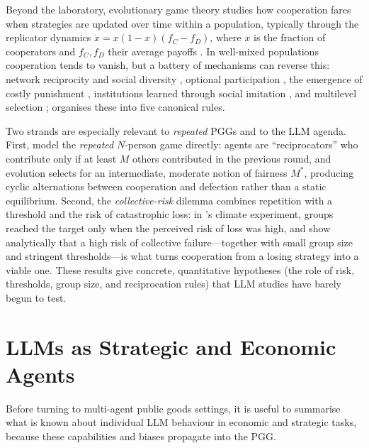 \documentclass[11pt,a4paper]{article}
\begin{document}
Beyond the laboratory, evolutionary game theory studies how cooperation fares
when strategies are updated over time within a population, typically through the
replicator dynamics $\dot{x}=x(1-x)(f_C-f_D)$, where $x$ is the fraction of
cooperators and $f_C,f_D$ their average payoffs
\citep{hofbauer1998evolutionary,sigmund2010calculus}. In well-mixed populations
cooperation tends to vanish, but a battery of mechanisms can reverse this:
network reciprocity and social diversity \citep{santos2008social,szabo2007evolutionary,
perc2017statistical}, optional participation \citep{hauert2002volunteering},
the emergence of costly punishment \citep{hauert2007freedom,boyd2003evolution},
institutions learned through social imitation \citep{sigmund2010social}, and
multilevel selection \citep{traulsen2006evolution}; \citet{nowak2006five}
organises these into five canonical rules.

Two strands are especially relevant to \emph{repeated} PGGs and to the LLM agenda.
First, \citet{vansegbroeck2012emergence} model the \emph{repeated} $N$-person
game directly: agents are ``reciprocators'' who contribute only if at least $M$
others contributed in the previous round, and evolution selects for an
intermediate, moderate notion of fairness $M^\ast$, producing cyclic alternations
between cooperation and defection rather than a static equilibrium. Second, the
\emph{collective-risk} dilemma combines repetition with a threshold and the risk
of catastrophic loss: in \citeauthor{milinski2008collective}'s
\citeyearpar{milinski2008collective} climate experiment, groups reached the target
only when the perceived risk of loss was high, and \citet{santos2011risk} show
analytically that a high risk of collective failure---together with small group
size and stringent thresholds---is what turns cooperation from a losing strategy
into a viable one. These results give concrete, quantitative hypotheses (the role
of risk, thresholds, group size, and reciprocation rules) that LLM studies have
barely begun to test.

\section{LLMs as Strategic and Economic Agents}
\label{sec:agents}

Before turning to multi-agent public goods settings, it is useful to summarise
what is known about individual LLM behaviour in economic and strategic tasks,
because these capabilities and biases propagate into the PGG.
\end{document}
